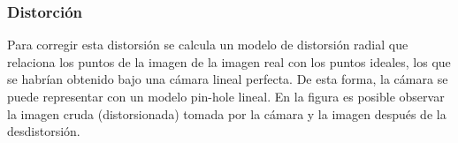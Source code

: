 \begin{frame}
	\frametitle{Distorción}
	
	Para corregir esta distorsión se calcula un modelo de distorsión radial que relaciona los puntos de la imagen de la imagen real con los puntos ideales, los que se habrían obtenido bajo una cámara lineal perfecta. De esta forma, la cámara se puede representar con un modelo pin-hole lineal. En la figura es posible observar la imagen cruda (distorsionada) tomada por la cámara y la imagen después de la desdistorsión.
	
	\begin{figure}[!h]
		\centering
	\end{figure}
	
\end{frame}


